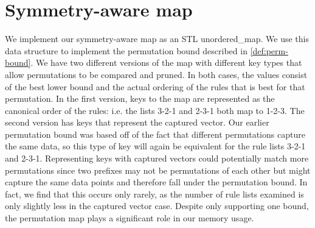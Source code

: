 \documentclass[]{article}
\begin{document}
\section{Symmetry-aware map}
We implement our symmetry-aware map as an STL unordered\_map.
We use this data structure to implement the permutation bound described in \ref{def:perm-bound}.
We have two different versions of the map with different key types that allow permutations to be compared and pruned.
In both cases, the values consist of the best lower bound and the actual ordering of the rules that is best for that permutation.
In the first version, keys to the map are represented as the canonical order of the rules: i.e. the lists 3-2-1 and 2-3-1 both map to 1-2-3.
The second version has keys that represent the captured vector.
Our earlier permutation bound was based off of the fact that different permutations capture the same data, so this type of key will again be equivalent for the rule lists 3-2-1 and 2-3-1.
Representing keys with captured vectors could potentially match more permutations since two prefixes may not be permutations of each other but might capture the same data points and therefore fall under the permutation bound.
In fact, we find that this occurs only rarely, as the number of rule lists examined is only slightly less in the captured vector case.
Despite only supporting one bound, the permutation map plays a significant role in our memory usage.
\end{document}
